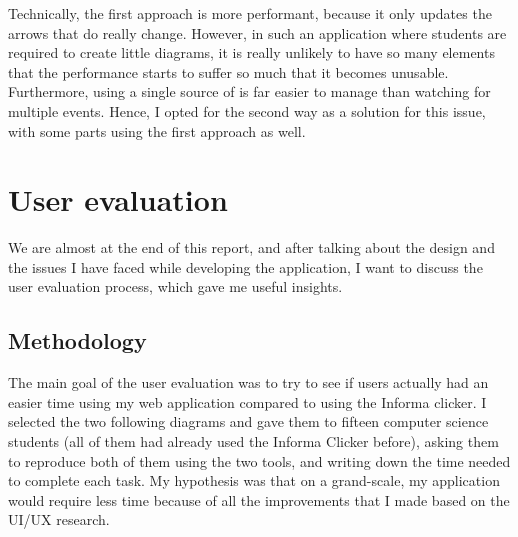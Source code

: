 \documentclass[]{usiinfbachelorproject}
\begin{document}
\noindent Technically, the first approach is more performant, because it only updates the arrows that do really change. However, in such an application where students are required to create little diagrams, it is really unlikely to have so many elements that the performance starts to suffer so much that it becomes unusable. Furthermore, using a single source of is far easier to manage than watching for multiple events. Hence, I opted for the second way as a solution for this issue, with some parts using the first approach as well.


\vspace{\fill}

\pagebreak

\section{User evaluation} \label{Testing}


We are almost at the end of this report, and after talking about the design and the issues I have faced while developing the application, I want to discuss the user evaluation process, which gave me useful insights.

\subsection{Methodology}

The main goal of the user evaluation was to try to see if users actually had an easier time using my web application compared to using the Informa clicker. I selected the two following diagrams and gave them to fifteen computer science students (all of them had already used the Informa Clicker before), asking them to reproduce both of them using the two tools, and writing down the time needed to complete each task. My hypothesis was that on a grand-scale, my application would require less time because of all the improvements that I made based on the UI/UX research.
\end{document}
